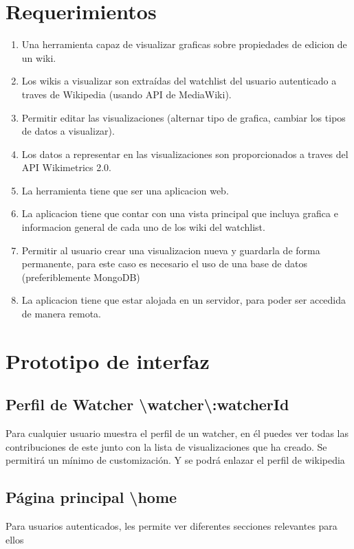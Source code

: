\section{Requerimientos}
    \begin{enumerate}
        \item{Una herramienta capaz de visualizar graficas sobre propiedades de edicion de un wiki.}
        \item{Los wikis a visualizar son extraídas del watchlist del usuario autenticado a traves de Wikipedia (usando API de MediaWiki).}
        \item{Permitir editar las visualizaciones (alternar tipo de grafica, cambiar los tipos de datos a visualizar).}
        \item{Los datos a representar en las visualizaciones son proporcionados a traves del API Wikimetrics 2.0.}
        \item{La herramienta tiene que ser una aplicacion web.}
        \item{La aplicacion tiene que contar con una vista principal que incluya grafica e informacion general de cada uno de los wiki del watchlist.}
        \item{Permitir al usuario crear una visualizacion nueva y guardarla de forma permanente, para este caso es necesario el uso de una base de datos (preferiblemente MongoDB)}
        \item{La aplicacion tiene que estar alojada en un servidor, para poder ser accedida de manera remota.}
    \end{enumerate}

\section{Prototipo de interfaz}

\subsection{Perfil de Watcher \textbackslash watcher\textbackslash:watcherId}
Para cualquier usuario muestra el perfil de un watcher, en él puedes ver todas las contribuciones de este junto con la lista de visualizaciones que ha creado.
Se permitirá un mínimo de customización. Y se podrá enlazar el perfil de wikipedia


\subsection{Página principal \textbackslash home}
Para usuarios autenticados, les permite ver diferentes secciones relevantes para ellos

